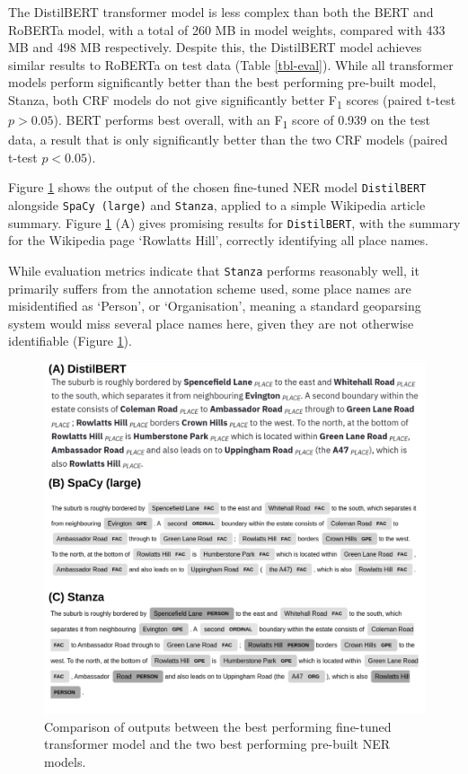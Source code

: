 \documentclass[
  letterpaper,
  11pt,
  english,
  onehalfspacing,
  headsepline]{MastersDoctoralThesis}
\begin{document}
The DistilBERT transformer model is less complex than both the BERT and
RoBERTa model, with a total of 260 MB in model weights, compared with
433 MB and 498 MB respectively. Despite this, the DistilBERT model
achieves similar results to RoBERTa on test data (Table \ref{tbl-eval}).
While all transformer models perform significantly better than the best
performing pre-built model, Stanza, both CRF models do not give
significantly better F\textsubscript{1} scores (paired t-test
\(p>0.05\)). BERT performs best overall, with an F\textsubscript{1}
score of 0.939 on the test data, a result that is only significantly
better than the two CRF models (paired t-test \(p<0.05)\).

Figure \ref{fig-qual} shows the output of the chosen fine-tuned NER
model \texttt{DistilBERT} alongside \texttt{SpaCy\ (large)} and
\texttt{Stanza}, applied to a simple Wikipedia article summary. Figure
\ref{fig-qual} (A) gives promising results for \texttt{DistilBERT}, with
the summary for the Wikipedia page `Rowlatts Hill', correctly
identifying all place names.

While evaluation metrics indicate that \texttt{Stanza} performs
reasonably well, it primarily suffers from the annotation scheme used,
some place names are misidentified as `Person', or `Organisation',
meaning a standard geoparsing system would miss several place names
here, given they are not otherwise identifiable (Figure \ref{fig-qual}).

\begin{figure}

{\centering \includegraphics{03_transformer/./03_figures/figure2.jpg}

}

\caption{\label{fig-qual}Comparison of outputs between the best
performing fine-tuned transformer model and the two best performing
pre-built NER models.}

\end{figure}
\end{document}

